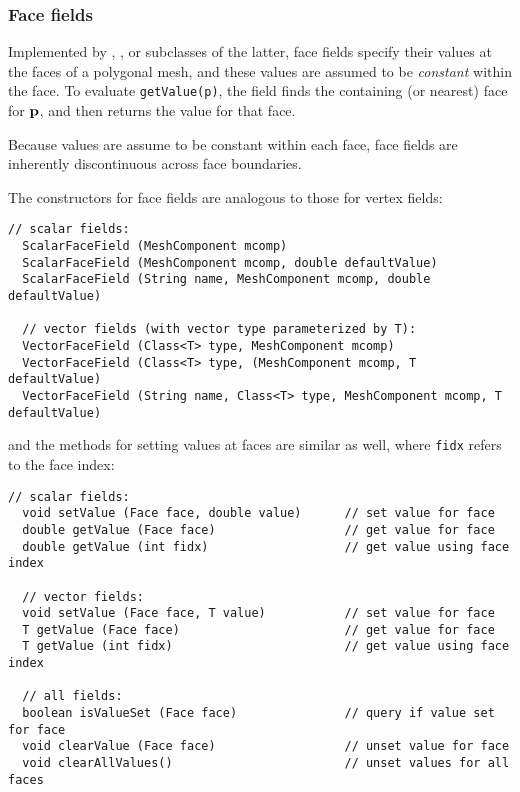 \subsubsection{Face fields}

Implemented by
,
, 
or subclasses of the latter, face fields specify their values at the
faces of a polygonal mesh, and these values are assumed to be {\it
constant} within the face. To evaluate {\tt getValue(p)}, the field
finds the containing (or nearest) face for ${\bf p}$, and then returns the
value for that face.

\begin{sideblock}
Because values are assume to be constant within each face, face fields
are inherently discontinuous across face boundaries.
\end{sideblock}

The constructors for face fields are analogous to those
for vertex fields:
%
\begin{lstlisting}[]
  // scalar fields:
  ScalarFaceField (MeshComponent mcomp)
  ScalarFaceField (MeshComponent mcomp, double defaultValue)
  ScalarFaceField (String name, MeshComponent mcomp, double defaultValue)

  // vector fields (with vector type parameterized by T):
  VectorFaceField (Class<T> type, MeshComponent mcomp)
  VectorFaceField (Class<T> type, (MeshComponent mcomp, T defaultValue)
  VectorFaceField (String name, Class<T> type, MeshComponent mcomp, T defaultValue)
\end{lstlisting}
%
and the methods for setting values at faces are similar as
well, where {\tt fidx} refers to the face index:
%
\begin{lstlisting}[]
  // scalar fields:
  void setValue (Face face, double value)      // set value for face
  double getValue (Face face)                  // get value for face
  double getValue (int fidx)                   // get value using face index

  // vector fields:
  void setValue (Face face, T value)           // set value for face
  T getValue (Face face)                       // get value for face
  T getValue (int fidx)                        // get value using face index

  // all fields:
  boolean isValueSet (Face face)               // query if value set for face
  void clearValue (Face face)                  // unset value for face
  void clearAllValues()                        // unset values for all faces
\end{lstlisting}
%

